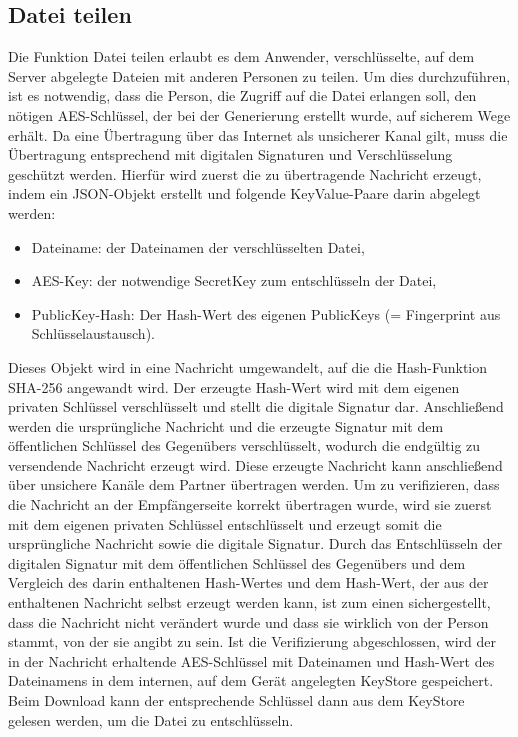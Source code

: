 \documentclass[10pt, a4paper,headsepline,pointednumbers]{scrreprt}
\begin{document}
\subsection{Datei teilen}
Die Funktion Datei teilen erlaubt es dem Anwender, verschlüsselte, auf dem Server abgelegte Dateien mit anderen Personen zu teilen. Um dies durchzuführen, ist es notwendig, dass die Person, die Zugriff auf die Datei erlangen soll, den nötigen AES-Schlüssel, der bei der Generierung erstellt wurde, auf sicherem Wege erhält. Da eine Übertragung über das Internet als unsicherer Kanal gilt, muss die Übertragung entsprechend mit digitalen Signaturen und Verschlüsselung geschützt werden. Hierfür wird zuerst die zu übertragende Nachricht erzeugt, indem ein JSON-Objekt erstellt und folgende KeyValue-Paare darin abgelegt werden:
\begin{itemize}
\item Dateiname: der Dateinamen der verschlüsselten Datei,
\item AES-Key: der notwendige SecretKey zum entschlüsseln der Datei,
\item PublicKey-Hash: Der Hash-Wert des eigenen PublicKeys (= Fingerprint aus Schlüsselaustausch).
\end{itemize}
Dieses Objekt wird in eine Nachricht umgewandelt, auf die die Hash-Funktion SHA-256 angewandt wird. Der erzeugte Hash-Wert wird mit dem eigenen privaten Schlüssel verschlüsselt und stellt die digitale Signatur dar. Anschließend werden die ursprüngliche Nachricht und die erzeugte Signatur mit dem öffentlichen Schlüssel des Gegenübers verschlüsselt, wodurch die endgültig zu versendende Nachricht erzeugt wird. Diese erzeugte Nachricht kann anschließend über unsichere Kanäle dem Partner übertragen werden. Um zu verifizieren, dass die Nachricht an der Empfängerseite korrekt übertragen wurde, wird sie zuerst mit dem eigenen privaten Schlüssel entschlüsselt und erzeugt somit die ursprüngliche Nachricht sowie die digitale Signatur. Durch das Entschlüsseln der digitalen Signatur mit dem öffentlichen Schlüssel des Gegenübers und dem Vergleich des darin enthaltenen Hash-Wertes und dem Hash-Wert, der aus der enthaltenen Nachricht selbst erzeugt werden kann, ist zum einen sichergestellt, dass die Nachricht nicht verändert wurde und dass sie wirklich von der Person stammt, von der sie angibt zu sein. Ist die Verifizierung abgeschlossen, wird der in der Nachricht erhaltende AES-Schlüssel mit Dateinamen und Hash-Wert des Dateinamens in dem internen, auf dem Gerät angelegten KeyStore gespeichert. Beim Download kann der entsprechende Schlüssel dann aus dem KeyStore gelesen werden, um die Datei zu entschlüsseln.
\end{document}
